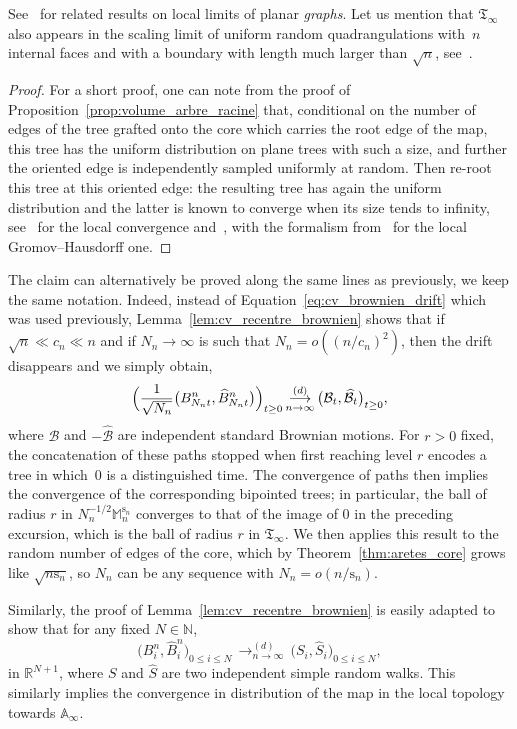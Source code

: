 \documentclass[11pt]{article}
\theoremstyle{plain}
\theoremstyle{definition}
\theoremstyle{remark}
\newcommand{\N}{\mathbb{N}}
\newcommand{\R}{\mathbb{R}}
\newcommand{\Tree}{\mathfrak{T}}
\newcommand{\Mapb}{\mathbb{M}}
\newcommand{\spar}{\mathrm{s}}
\newcommand{\cvloi}[1][n]{\,\mathop{\longrightarrow}^{(d)}_{#1 \to \infty}\,}
\begin{document}
See~\cite{KM21a} for related results on local limits of planar \emph{graphs}.
Let us mention that $\Tree_\infty$ also appears in the scaling limit of uniform random quadrangulations with~$n$ internal faces and with a boundary with length much larger than $\sqrt{n}$, see~\cite[Th.\,3.4]{BMR19}.

\begin{proof}
For a short proof, one can note from the proof of Proposition~\ref{prop:volume_arbre_racine} that, conditional on the number of edges of the tree grafted onto the core which carries the root edge of the map, this tree has the uniform distribution on plane trees with such a size, and further the oriented edge is independently sampled uniformly at random. Then re-root this tree at this oriented edge: the resulting tree has again the uniform distribution and the latter is known to converge when its size tends to infinity, see~\cite[Th.\,7.1]{Jan12} for the local convergence and~\cite[\S 2.5]{Ald91c}, with the formalism from~\cite{DLG05} for the local Gromov--Hausdorff one.
\end{proof}

The claim can alternatively be proved along the same lines as previously, we keep the same notation.
Indeed, instead of Equation~\eqref{eq:cv_brownien_drift} which was used previously, Lemma~\ref{lem:cv_recentre_brownien} shows that if $\sqrt{n} \ll c_n \ll n$ and if $N_{n} \to \infty$ is such that $N_{n} = o((n/c_{n})^2)$, then the drift disappears and we simply obtain,
\[
\Bigl(\frac{1}{\sqrt{N_{n}}} \bigl(B^{n}_{N_{n}t}, \widehat{B}^{n}_{N_{n}t}\bigr)\Bigl)_{t \ge 0}
\cvloi \bigl(\mathcal{B}_{t}, \widehat{\mathcal{B}}_{t}\bigr)_{t \ge 0},
\]
where $\mathcal{B}$ and $-\widehat{\mathcal{B}}$ are independent standard Brownian motions.
For $r>0$ fixed, the concatenation of these paths stopped when first reaching level $r$ encodes a tree in which~$0$ is a distinguished time.
The convergence of paths then implies the convergence of the corresponding bipointed trees; in particular, the ball of radius $r$ in $N_n^{-1/2} \Mapb_n^{\spar_n}$ converges to that of the image of $0$ in the preceding excursion, which is the ball of radius $r$ in $\Tree_\infty$.
We then applies this result to the random number of edges of the core, which by Theorem~\ref{thm:aretes_core} grows like $\sqrt{n\spar_n}$, so $N_n$ can be any sequence with $N_n = o(n/\spar_n)$.

Similarly, the proof of Lemma~\ref{lem:cv_recentre_brownien} is easily adapted to show that
for any fixed $N \in \N$,
\[
\big(B^{n}_{i}, \widehat{B}^{n}_{i}\big)_{0 \le i \le N} \cvloi \big(S_{i}, \widehat{S}_{i}\big)_{0 \le i \le N},
\]
in $\R^{N+1}$, where $S$ and $\widehat{S}$ are two independent simple random walks.
This similarly implies the convergence in distribution of the map in the local topology towards $\mathbb{A}_\infty$.
\end{document}
